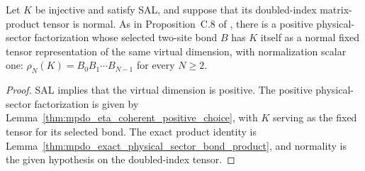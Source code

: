 \begin{corollary}%
    \label{cor:mpdo_normal_fixed_product_tensor_of_is_sal}
    \leanok
    Let $K$ be injective and satisfy SAL, and suppose that its doubled-index
    matrix-product tensor is normal. As in Proposition~C.8 of
    \cite{Cirac2016MPDO_arXiv}, there is a positive physical-sector
    factorization whose selected two-site bond $B$ has $K$ itself as a normal
    fixed tensor representation of the same virtual dimension, with
    normalization scalar one:
    $\rho_N(K)=B_0B_1\cdots B_{N-1}$ for every $N\geq2$.
\end{corollary}

\begin{proof}
    \leanok
    SAL implies that the virtual dimension is positive. The positive
    physical-sector factorization is given by
    Lemma~\ref{thm:mpdo_eta_coherent_positive_choice}, with $K$ serving as
    the fixed tensor for its selected bond. The exact product identity is
    Lemma~\ref{thm:mpdo_exact_physical_sector_bond_product}, and normality
    is the given hypothesis on the doubled-index tensor.
\end{proof}
